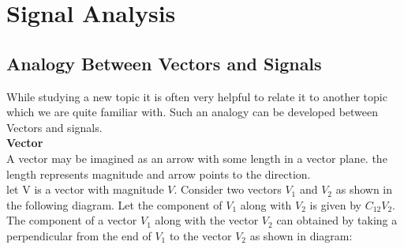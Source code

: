 \documentclass[a4paper,12pt]{book}
\begin{document}
\section{Signal Analysis}
\subsection{Analogy Between Vectors and Signals}
While studying a new topic it is often very helpful to relate it to another topic which we are quite familiar with. Such an analogy can be developed between Vectors and signals.\smallskip\\
{\bf Vector }\\ A vector may be imagined as an arrow with some length in a vector plane. the length represents magnitude and arrow points to the direction.\\
let V is a vector with magnitude $V$. Consider two vectors $V_1$ and $V_2$ as shown in the following diagram. Let the component of $V_1$ along with $V_2$ is given by $C_{12}V_2$.\\
The component of a vector $V_1$ along with the vector $V_2$ can obtained by taking a perpendicular from the end of $V_1$ to the vector $V_2$ as shown in diagram:
\begin{figure}[h]
\centering 
{}
\end{figure}
\end{document}
